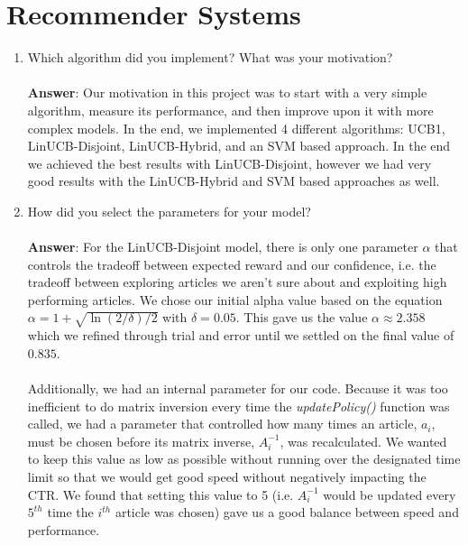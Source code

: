 \documentclass[11pt]{article}
\begin{document}
\section{Recommender Systems}

\begin{enumerate}
\item Which algorithm did you implement? What was your motivation? \\ \\
\textbf{Answer}: Our motivation in this project was to start with a very simple algorithm,
measure its performance, and then improve upon it with more complex models.  In
the end, we implemented 4 different algorithms: UCB1, LinUCB-Disjoint, LinUCB-Hybrid, and an SVM
based approach.  In the end we achieved the best results with LinUCB-Disjoint,
however we had very good results with the LinUCB-Hybrid and SVM based approaches
as well.

\item How did you select the parameters for your model? \\ \\
\textbf{Answer}: For the LinUCB-Disjoint model, there is only one parameter
$\alpha$ that controls the tradeoff between expected reward and our confidence,
i.e. the tradeoff between exploring articles we aren't sure about and exploiting
high performing articles. We chose our initial alpha value based on the equation
$\alpha=1+\sqrt{\ln(2/\delta)/2}$ with $\delta=0.05$.  This gave us the value
$\alpha\approx2.358$ which we refined through trial and error until we settled
on the final value of $0.835$. \\ \\
Additionally, we had an internal parameter for our code.  Because it was too
inefficient to do matrix inversion every time the \textit{updatePolicy()}
function was called, we had a parameter that controlled how many times an
article, $a_i$, must be chosen before its matrix inverse, $A_{i}^{-1}$, was
recalculated. We wanted to keep this value as low as possible without running
over the designated time limit so that we would get good speed without
negatively impacting the CTR. We found that setting this value to 5 (i.e.
$A_{i}^{-1}$ would be updated every $5^{th}$ time the $i^{th}$ article was
chosen) gave us a good balance between speed and performance.


\end{enumerate}
\end{document}
